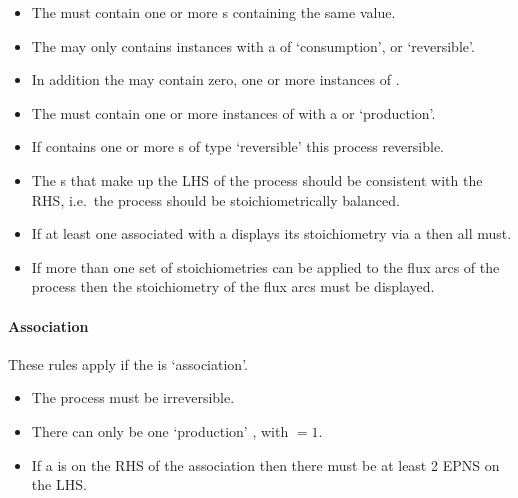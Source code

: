 \begin{itemize}
\item The  must contain one or more
  s containing the same  value.
\item The  may only contains 
  instances with a  of `consumption', or `reversible'.
\item In addition the  may contain zero, one or more
  instances of .
\item The  must contain one or more
 instances of  with a  or `production'.
\item If   contains one or more s
  of type `reversible' this process reversible.
\item The s that make up the LHS of the
  process should be consistent with the RHS, i.e.\, the process should
 be stoichiometrically balanced.
\item If at least one  associated with a
   displays its stoichiometry via a
   then all must.
\item If more than one set of stoichiometries can be applied to the
  flux arcs of the process then the stoichiometry of the flux arcs
  must be displayed.
\end{itemize}


\paragraph{Association}

These rules apply if the  is `association'.

\begin{itemize}
\item The process must be irreversible.
\item There can only be one `production' , with
   $= 1$.
\item If a  is on the RHS of the association then
  there must be at least 2 EPNS on the LHS.
\end{itemize}

